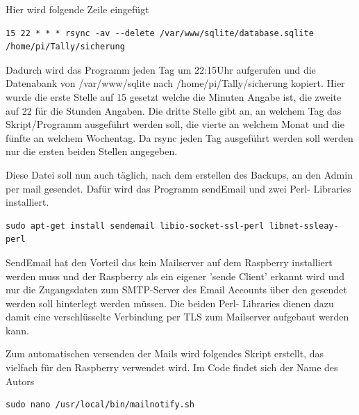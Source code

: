 \documentclass[11pt,a4paper]{article} %
\begin{document}
Hier wird folgende Zeile eingefügt
\begin{frame}

\begin{lstlisting}
15 22 * * * rsync -av --delete /var/www/sqlite/database.sqlite  /home/pi/Tally/sicherung
\end{lstlisting}
\end{frame}
Dadurch wird das Programm jeden Tag um 22:15Uhr aufgerufen und die Datenabank von /var/www/sqlite nach /home/pi/Tally/sicherung  kopiert. Hier wurde die erste Stelle auf 15 gesetzt welche die Minuten Angabe ist, die zweite auf 22 für die Stunden Angaben. Die dritte Stelle gibt an, an welchem Tag das Skript/Programm ausgeführt werden soll, die vierte an welchem Monat und die fünfte an welchem Wochentag. Da rsync jeden Tag ausgeführt werden soll werden nur die ersten beiden Stellen angegeben.
\par
Diese Datei soll nun auch täglich, nach dem erstellen des Backups, an den Admin per mail gesendet.
Dafür wird das Programm sendEmail und zwei Perl- Libraries installiert.
\begin{frame}

\begin{lstlisting}
sudo apt-get install sendemail libio-socket-ssl-perl libnet-ssleay-perl
\end{lstlisting}
\end{frame}
SendEmail hat den Vorteil das kein Mailserver auf dem Raspberry installiert werden muss und der Raspberry als ein eigener 'sende Client' erkannt wird und nur die Zugangsdaten zum SMTP-Server des Email Accounts über den gesendet werden soll hinterlegt werden müssen. Die beiden Perl- Libraries dienen dazu damit eine verschlüsselte Verbindung per TLS zum Mailserver aufgebaut werden kann.
\par
Zum automatischen versenden der Mails wird folgendes Skript erstellt, das vielfach für den Raspberry verwendet wird. Im Code findet sich der Name des Autors \cite{10}
\begin{frame}

\begin{lstlisting}
sudo nano /usr/local/bin/mailnotify.sh
\end{lstlisting}
\end{frame}
\end{document}
